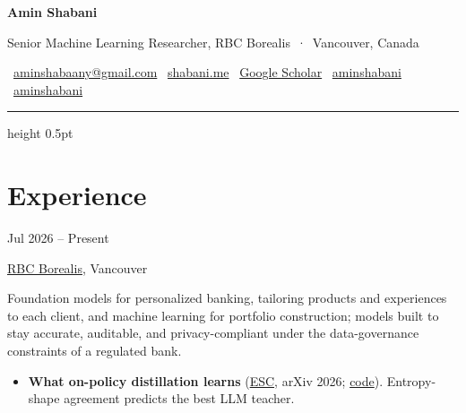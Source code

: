 \documentclass[10pt,letterpaper]{article}
\newcommand{\meta}[1]{{\ttfamily\footnotesize\color{faint}#1}}   %
\newcommand{\dates}[1]{\hfill\meta{#1}}
\newcommand{\soft}[1]{{\color{inksoft}#1}}
\newcommand{\entry}[3]{%
  \par\vspace{4pt}{\bfseries #1}\dates{#3}\par
  \soft{#2}\par\vspace{1pt}}
\begin{document}
{\fontsize{26}{28}\selectfont\bfseries Amin Shabani}\par
\vspace{4pt}
\soft{Senior Machine Learning Researcher, RBC Borealis \,·\, Vancouver, Canada}\par
\vspace{6pt}
\meta{%
  \faEnvelope[regular]\ \href{mailto:aminshabaany@gmail.com}{aminshabaany@gmail.com}\quad
  \faGlobe\ \href{https://shabani.me}{shabani.me}\quad
  \faGraduationCap\ \href{https://scholar.google.com/citations?user=NC5J2SkAAAAJ}{Google Scholar}\quad
  \faGithub\ \href{https://github.com/aminshabani}{aminshabani}\quad
  \faLinkedin\ \href{https://www.linkedin.com/in/aminshabani}{aminshabani}}
\vspace{6pt}
{\color{line}\hrule height 0.5pt}

\section{Experience}

\entry{Senior Machine Learning Researcher}{\href{https://rbcborealis.com/}{RBC Borealis}, Vancouver}{Jul 2026 -- Present}
\small Foundation models for personalized banking, tailoring products and experiences to each client, and machine learning for portfolio construction; models built to stay accurate, auditable, and privacy-compliant under the data-governance constraints of a regulated bank.
\begin{itemize}
  \item \textbf{What on-policy distillation learns} (\href{https://arxiv.org/abs/2610.39020}{ESC}, arXiv 2026; \href{https://github.com/maybenotime/opd-esc}{code}). Entropy-shape agreement predicts the best LLM teacher.
\end{itemize}\normalsize
\end{document}
